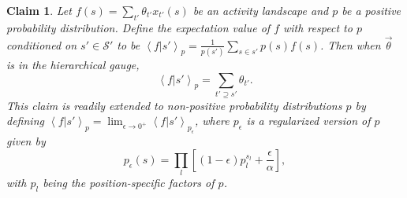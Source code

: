 \documentclass{article}
\numberwithin{myclaim}{section}
\newcommand{\braket}[1]{\left\langle #1 \right\rangle}
\newtheorem{claim}{Claim}
\begin{document}
\newcommand{\mychars}[3]{ { {#1}'_{{#2}_1} \cdots {#1}'_{{#2}_{#3}} } }
\newcommand{\myposs}[2]{ { {#1}_1 \cdots {#1}_{#2} } }
\newcommand{\mysum}[3]{\sum_\mychars{#1}{#2}{#3}}
\newcommand{\myps}[3]{ p^{{#1}'_{{#2}_1}}_{{#2}_1} \cdots  p^{{#1}'_{{#2}_{#3}}}_{{#2}_{#3}}}
\newcommand{\mydeltas}[4]{ \delta_{{#1}'_{{#3}_1} {#2}'_{{#3}_1 }} \cdots \delta_{{#1}'_{{#3}_{#4}} {#2}'_{{#3}_{#4}}} } 

\begin{claim}
Let $f(s) = \sum_{t'} \theta_{t'} x_{t'}(s)$ be an activity landscape and $p$ be a positive probability distribution. Define the expectation value of $f$ with respect to $p$ conditioned on $s' \in \mathcal{S'}$ to be $\braket{f|s'}_p = \frac{1}{p(s')} \sum_{s \in s'} p(s) f(s)$. Then when $\vec{\theta}$ is in the hierarchical gauge,
\begin{equation}
\braket{f|s'}_p = \sum_{t' \supseteq s'} \theta_{t'}.
\end{equation}
This claim is readily extended to non-positive probability distributions $p$ by defining $\braket{f|s'}_p = \lim_{\epsilon \to 0^+} \braket{f|s'}_{p_\epsilon}$, where $p_\epsilon$ is a regularized version of $p$ given by
\begin{equation}
p_\epsilon(s) = \prod_l \left[ (1-\epsilon) p_l^{s_l} + \frac{\epsilon}{\alpha} \right], 
\end{equation}
with $p_l$ being the position-specific factors of $p$.
\end{claim}
\end{document}
